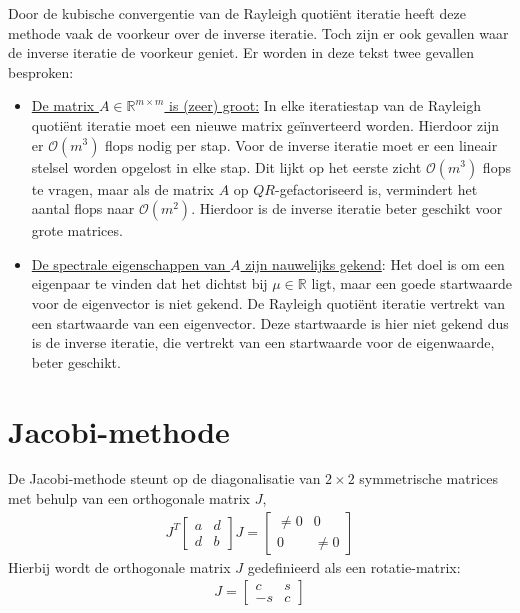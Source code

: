 \documentclass[a4paper, 12pt, titlepage, fleqn]{article}
\begin{document}
Door de kubische convergentie van de Rayleigh quoti\"ent iteratie heeft deze methode vaak de voorkeur over de inverse iteratie. Toch zijn er ook gevallen waar de inverse iteratie de voorkeur geniet. Er worden in deze tekst twee gevallen besproken:
\begin{itemize}
\item \underline{De matrix $A \in \mathbb{R}^{m\times m}$ is (zeer) groot:} In elke iteratiestap van de Rayleigh quoti\"ent iteratie moet een nieuwe matrix ge\"inverteerd worden. Hierdoor zijn er $\mathcal{O}(m^3)$ flops nodig per stap. Voor de inverse iteratie moet er een lineair stelsel worden opgelost in elke stap. Dit lijkt op het eerste zicht $\mathcal{O}(m^3)$ flops te vragen, maar als de matrix $A$ op $QR$-gefactoriseerd is, vermindert het aantal flops naar $\mathcal{O}(m^2)$. Hierdoor is de inverse iteratie beter geschikt voor grote matrices.
\item \underline{De spectrale eigenschappen van $A$ zijn nauwelijks gekend}: Het doel is om een eigenpaar te vinden dat het dichtst bij $\mu \in \mathbb{R}$ ligt, maar een goede startwaarde voor de eigenvector is niet gekend. De Rayleigh quoti\"ent iteratie vertrekt van een startwaarde van een eigenvector. Deze startwaarde is hier niet gekend dus is de inverse iteratie, die vertrekt van een startwaarde voor de eigenwaarde, beter geschikt.
\end{itemize}

\section{Jacobi-methode}\label{sec: jacobi}
De Jacobi-methode steunt op de diagonalisatie van $2 \times 2$ symmetrische matrices met behulp van een orthogonale matrix $J$,
\begin{align}\label{eq:jacobi}
J^T\left[\begin{matrix}
a &d\\
d &b
\end{matrix}\right]J = \left[ \begin{matrix}
\neq 0 &0\\
0 &\neq 0
\end{matrix}\right]
\end{align}
Hierbij wordt de orthogonale matrix $J$ gedefinieerd als een rotatie-matrix:
\begin{align}\label{eq:cs}
J  = \left[\begin{matrix}
c &s\\
-s &c
\end{matrix}\right]
\end{align}
\end{document}
